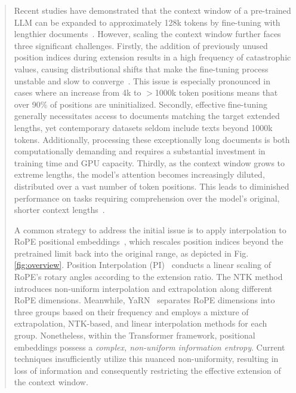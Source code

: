 \begin{abstract}
Recent studies have demonstrated that the context window of a pre-trained LLM can be expanded to approximately 128k tokens by fine-tuning with lengthier documents~\cite{longlora,pi,yarn,zhang2024soaring,liu2023scaling}. However, scaling the context window further faces three significant challenges. Firstly, the addition of previously unused position indices during extension results in a high frequency of catastrophic values, causing distributional shifts that make the fine-tuning process unstable and slow to converge~\cite{pi}. This issue is especially pronounced in cases where an increase from 4k to $>$1000k token positions means that over 90\% of positions are uninitialized. Secondly, effective fine-tuning generally necessitates access to documents matching the target extended lengths, yet contemporary datasets seldom include texts beyond 1000k tokens. Additionally, processing these exceptionally long documents is both computationally demanding and requires a substantial investment in training time and GPU capacity. Thirdly, as the context window grows to extreme lengths, the model’s attention becomes increasingly diluted, distributed over a vast number of token positions. This leads to diminished performance on tasks requiring comprehension over the model’s original, shorter context lengths~\cite{pi}.

A common strategy to address the initial issue is to apply interpolation to RoPE positional embeddings~\cite{rope,pi}, which rescales position indices beyond the pretrained limit back into the original range, as depicted in Fig.\ref{fig:overview}. Position Interpolation (PI)~\cite{pi} conducts a linear scaling of RoPE’s rotary angles according to the extension ratio. The NTK method~\cite{ntk,dynamicntk} introduces non-uniform interpolation and extrapolation along different RoPE dimensions. Meanwhile, YaRN~\cite{yarn} separates RoPE dimensions into three groups based on their frequency and employs a mixture of extrapolation, NTK-based, and linear interpolation methods for each group. Nonetheless, within the Transformer framework, positional embeddings possess a \emph{complex, non-uniform information entropy}. Current techniques insufficiently utilize this nuanced non-uniformity, resulting in loss of information and consequently restricting the effective extension of the context window.


\end{abstract}
